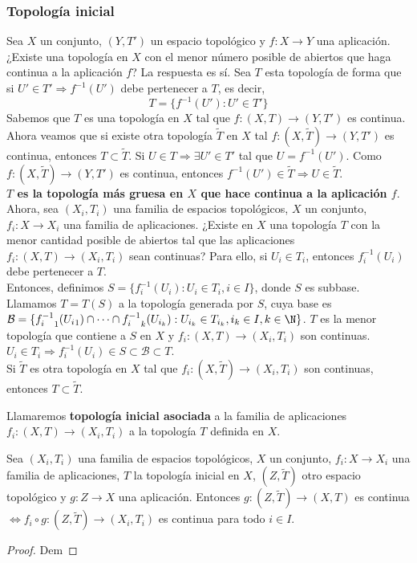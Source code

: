 \subsubsection{Topología inicial}
Sea $X$ un conjunto, $(Y,T')$ un espacio topológico y $f: X \to Y$ una aplicación. ¿Existe una topología en $X$ con el menor número posible de abiertos que haga continua a la aplicación $f$? La respuesta es sí. Sea $T$ esta topología de forma que si $U' \in T' \Rightarrow f^{-1}(U')$ debe pertenecer a $T$, es decir,
\[T = \{f^{-1}(U') : U' \in T'\}\]
Sabemos que $T$ es una topología en $X$ tal que $f: (X,T) \to (Y,T')$ es continua. Ahora veamos que si existe otra topología $\tilde{T}$ en $X$ tal $f: (X,\tilde{T}) \to (Y,T')$ es continua, entonces $T \subset \tilde{T}$. Si $U \in T \Rightarrow \exists U' \in T'$ tal que $U = f^{-1}(U')$. Como $f: (X,\tilde{T}) \to (Y,T')$ es continua, entonces $f^{-1}(U') \in \tilde{T} \Rightarrow U \in \tilde{T}$. \\

\textbf{$T$ es la topología más gruesa en $X$ que hace continua a la aplicación $f$}.\\

Ahora, sea $(X_i,T_i)$ una familia de espacios topológicos, $X$ un conjunto, $f_i: X \to X_i$ una familia de aplicaciones. ¿Existe en $X$ una topología $T$ con la menor cantidad posible de abiertos tal que las aplicaciones $f_i:(X,T) \to (X_i,T_i)$ sean continuas? Para ello, si $U_i \in T_i$, entonces $f^{-1}_i(U_i)$ debe pertenecer a $T$. \\

Entonces, definimos $S=\{f^{-1}_i(U_i) : U_i \in T_i, i \in I\}$, donde $S$ es subbase. Llamamos $T=T(S)$ a la topología generada por $S$, cuya base es $\mathcal{B} = \{{f^{-1}_i}_1({U_i}_1) \cap \dots \cap {f^{-1}_i}_k(U_{i_k}) : U_{i_k} \in T_{i_k}, i_k \in I, k \in \N\}$. $T$ es la menor topología que contiene a $S$ en $X$ y $f_i:(X,T) \to (X_i,T_i)$ son continuas. $U_i \in T_i \Rightarrow f^{-1}_i(U_i) \in S \subset \mathcal{B} \subset T$. \\

Si $\tilde{T}$ es otra topología en $X$ tal que $f_i:(X,\tilde{T}) \to (X_i,T_i)$ son continuas, entonces $T \subset \tilde{T}$.

\begin{ndef}
  Llamaremos \textbf{topología inicial asociada} a la familia de aplicaciones $f_i:(X,T) \to (X_i,T_i)$ a la topología $T$ definida en $X$.
\end{ndef}
\begin{properties}
    Sea $(X_i,T_i)$ una familia de espacios topológicos, $X$ un conjunto, $f_i: X \to X_i$ una familia de aplicaciones, $T$ la topología inicial en $X$, $(Z,\tilde{T})$ otro espacio topológico y $g: Z \to X$ una aplicación. Entonces $g: (Z,\tilde{T}) \to (X,T)$ es continua $\Leftrightarrow f_i \circ g: (Z,\tilde{T}) \to (X_i,T_i)$ es continua para todo $i \in I$.
\end{properties}
\begin{proof}
    Dem
\end{proof}

